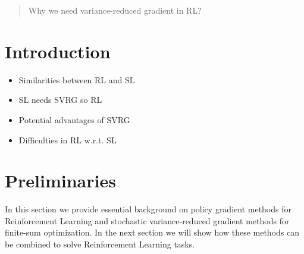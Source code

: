 \documentclass{article}
\makeatletter
\theoremstyle{remark}
\theoremstyle{definition}
\DeclareRobustCommand{\wrt}{w.r.t.\@\xspace}
\makeatother
\begin{document}
\begin{abstract}
Why we need variance-reduced gradient in RL?
\end{abstract}

\section{Introduction}
\begin{itemize}
        \item Similarities between RL and SL
        \item SL needs SVRG so RL
        \item Potential advantages of SVRG
        \item Difficulties in RL \wrt SL
\end{itemize}

\section{Preliminaries}
In this section we provide essential background on policy gradient methods for Reinforcement Learning and stochastic variance-reduced gradient methods for finite-sum optimization. In the next section we will show how these methods can be combined to solve Reinforcement Learning tasks.
\end{document}
